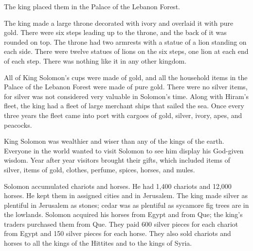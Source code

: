 {The king
placed
them in the Palace
of the Lebanon
Forest.
\par }{\PP {}The king
made
a large
throne
decorated with ivory
and overlaid
it with pure gold.
There were six
steps
leading up to the throne,
and the back of it was rounded
on top.
The throne
had two
armrests
with a statue of a lion
standing
on each side.
There
were twelve
statues
of lions
on
the six
steps,
one lion at each end of each step. There was nothing
like
it in any
other kingdom.
\par }{\PP {}All
of King
Solomon’s
cups
were made of gold,
and all
the household items
in the Palace
of the Lebanon
Forest
were made of pure
gold.
There were no
silver
items, for silver was not
considered
very valuable
in Solomon’s
time.
Along
with
Hiram’s
fleet,
the king
had a fleet
of large merchant ships
that sailed the sea.
Once every
three
years
the fleet
came into
port
with cargoes
of gold,
silver,
ivory,
apes,
and peacocks.
\par }{\PP {}King
Solomon
was wealthier
and wiser
than any
of the kings
of the earth.
Everyone
in the world
wanted
to visit Solomon
to see him
display
his God-given
wisdom.
Year
after
year
visitors
brought
their gifts,
which included items
of silver,
items
of gold,
clothes,
perfume,
spices,
horses,
and mules.
\par }{\PP {}Solomon
accumulated
chariots
and horses.
He had
1,400
chariots
and 12,000
horses.
He kept
them in assigned cities
and in
Jerusalem.
The king
made
silver
as plentiful in Jerusalem
as stones;
cedar
was
as plentiful
as sycamore fig trees
are in the lowlands.
Solomon
acquired
his horses
from Egypt
and from Que;
the king’s
traders
purchased them from Que.
They paid
600
silver pieces
for each chariot
from Egypt
and 150
silver pieces for each horse.
They also
sold
chariots and horses to all
the kings
of the Hittites
and to the kings
of Syria.

}
